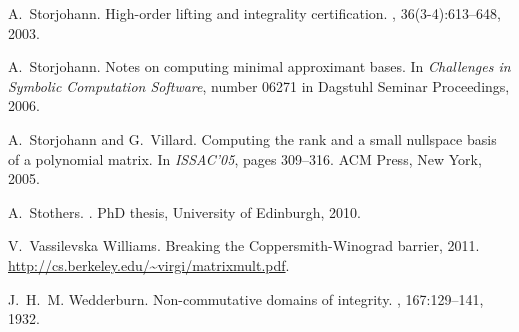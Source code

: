 \documentclass{sig-alt-full}
\begin{document}
\begin{thebibliography}{10}
A.~Storjohann.
\newblock High-order lifting and integrality certification.
, 36(3-4):613--648, 2003.

A.~Storjohann.
\newblock Notes on computing minimal approximant bases.
\newblock In {\em Challenges in Symbolic Computation Software}, number 06271 in
  Dagstuhl Seminar Proceedings, 2006.

A.~Storjohann and G.~Villard.
\newblock Computing the rank and a small nullspace basis of a polynomial
  matrix.
\newblock In {\em ISSAC'05}, pages 309--316. ACM Press, New York, 2005.

A.~Stothers.
.
\newblock PhD thesis, University of Edinburgh, 2010.

V.~{Vassilevska Williams}.
\newblock Breaking the {C}oppersmith-{W}inograd barrier, 2011.
\newblock \url{http://cs.berkeley.edu/~virgi/matrixmult.pdf}.

J.~H.~M. Wedderburn.
\newblock Non-commutative domains of integrity.
, 167:129--141, 1932.

\end{thebibliography}
\end{document}
